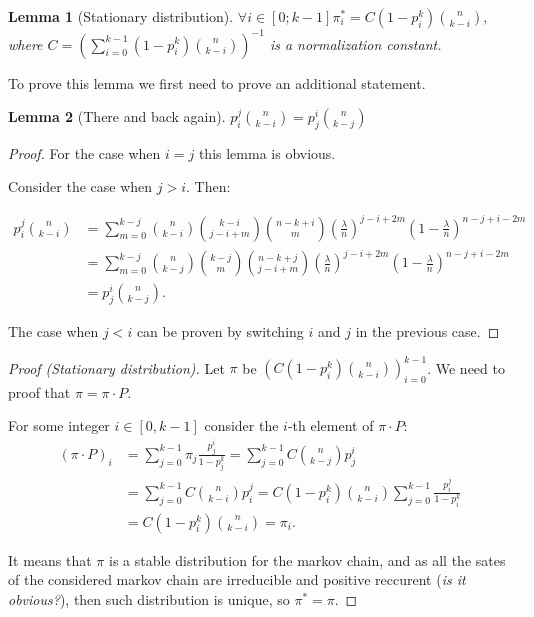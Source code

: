 \documentclass{article}
\newtheorem{lemma}{Lemma}
\begin{document}
\begin{lemma}[Stationary distribution]
$\forall i \in [0; k - 1] \pi_i^* = C (1 - p_i^k) \binom{n}{k - i},$ where $C = \left(\sum\limits_{i = 0}^{k - 1} (1 - p_i^k) \binom{n}{k - i}\right)^{-1}$ is a normalization constant.
\end{lemma}

To prove this lemma we first need to prove an additional statement.

\begin{lemma}[There and back again]
$p_i^j \binom{n}{k - i} = p_j^i \binom{n}{k - j}$
\end{lemma}

\begin{proof}
For the case when $i = j$ this lemma is obvious.

Consider the case when $j > i.$ Then:

\begin{align*}
  p_i^j \binom{n}{k - i} &= \sum\limits_{m = 0}^{k - j} \binom{n}{k - i} \binom{k - i}{j - i + m} \binom{n - k + i}{m} \left(\frac{\lambda}{n}\right)^{j - i + 2m} \left(1 - \frac{\lambda}{n}\right)^{n - j + i - 2m} \\
  &= \sum\limits_{m = 0}^{k - j} \binom{n}{k - j} \binom{k - j}{m} \binom{n - k + j}{j - i + m} \left(\frac{\lambda}{n}\right)^{j - i + 2m} \left(1 - \frac{\lambda}{n}\right)^{n - j + i - 2m} \\
  &= p_j^i \binom{n}{k - j}.
\end{align*}

The case when $j < i$ can be proven by switching $i$ and $j$ in the previous case.
\end{proof}

\begin{proof}[Proof (Stationary distribution)]
Let $\pi$ be $\left(C (1 - p_i^k) \binom{n}{k - i}\right)_{i = 0}^{k - 1}$. We need to proof that $\pi = \pi \cdot P.$

For some integer $i \in [0, k - 1]$ consider the $i$-th element of $\pi \cdot P$:
\begin{align*}
(\pi \cdot P)_i &= \sum\limits_{j = 0}^{k - 1} \pi_j \frac{p_j^i}{1 - p_j^k} = \sum\limits_{j = 0}^{k - 1} C \binom{n}{k - j} p_j^i \\
&= \sum\limits_{j = 0}^{k - 1} C \binom{n}{k - i} p_i^j = C (1 - p_i^k) \binom{n}{k - i} \sum\limits_{j = 0}^{k - 1} \frac{p_i^j}{1 - p_i^k} \\
&= C (1 - p_i^k) \binom{n}{k - i} = \pi_i.
\end{align*}

It means that $\pi$ is a stable distribution for the markov chain, and as all the sates of the considered markov chain are irreducible and positive reccurent (\textit{is it obvious?}), then such distribution is unique, so $\pi^* = \pi$.
\end{proof}
\end{document}
